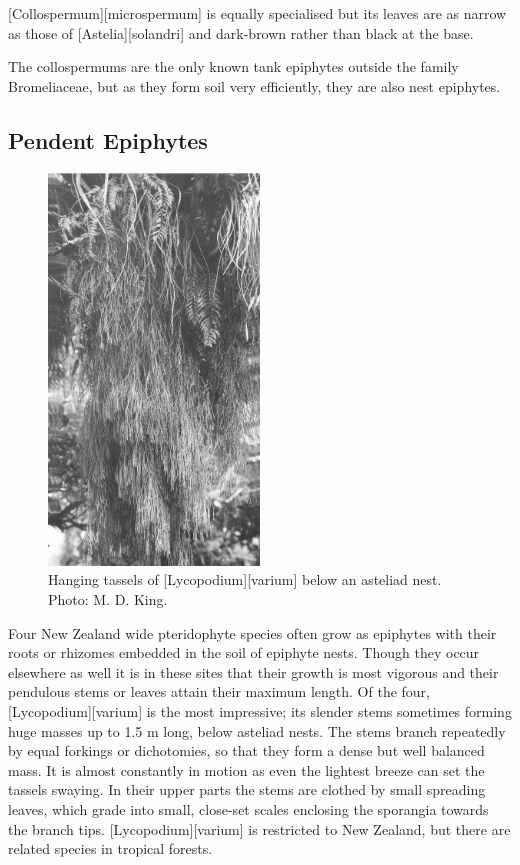 [Collospermum][microspermum] is equally specialised but its leaves are as narrow as those of [Astelia][solandri] and dark-brown rather than black at the base.

The collospermums are the only known tank epiphytes outside the family Bromeliaceae, but as they form soil very efficiently, they are also nest epiphytes.

\subsection{Pendent Epiphytes}

\begin{figure}
	\includegraphics[width=0.5\textwidth]{graphics/figure42lycopodium.jpg}
	\centering
	\caption[Hanging tassels of Lycopodium varium]{Hanging tassels of [Lycopodium][varium] below an asteliad nest.
	Photo: M. D. King.}%
	\label{fig:42lycopodium}
\end{figure}

Four New Zealand wide pteridophyte species often grow as epiphytes with their roots or rhizomes embedded in the soil of epiphyte nests.
Though they occur elsewhere as well it is in these sites that their growth is most vigorous and their pendulous stems or leaves attain their maximum length.
Of the four, [Lycopodium][varium] is the most impressive; its slender stems sometimes forming huge masses up to 1.5 m long, below asteliad nests.
The stems branch repeatedly by equal forkings or dichotomies, so that they form a dense but well balanced mass.
It is almost constantly in motion as even the lightest breeze can set the tassels swaying.
In their upper parts the stems are clothed by small spreading leaves, which grade into small, close-set scales enclosing the sporangia towards the branch tips. [Lycopodium][varium] is restricted to New Zealand, but there are related species in tropical forests.

